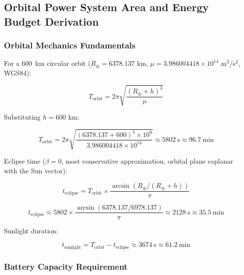 \subsection{Orbital Power System Area and Energy Budget Derivation}
\label{sec:orbit-power}

\subsubsection{Orbital Mechanics Fundamentals}

For a 600~km circular orbit ($R_{\oplus} = 6378.137$ km, $\mu = 3.986004418 \times 10^{14}$ m$^3$/s$^2$, WGS84):

\begin{equation}
  T_{\text{orbit}} = 2\pi\sqrt{\frac{(R_{\oplus} + h)^{3}}{\mu}}
  \label{eq:orbit-period}
\end{equation}

Substituting $h = 600$ km:

\begin{equation}
  T_{\text{orbit}} = 2\pi\sqrt{\frac{(6378.137 + 600)^{3} \times 10^{9}}{3.986004418 \times 10^{14}}}
                     \approx 5802\ \text{s} \approx 96.7\ \text{min}
\end{equation}

Eclipse time ($\beta = 0$, most conservative approximation, orbital plane coplanar with the Sun vector):

\begin{equation}
  t_{\text{eclipse}} = T_{\text{orbit}} \times \frac{\arcsin(R_{\oplus} / (R_{\oplus} + h))}{\pi}
  \label{eq:eclipse-time}
\end{equation}

\begin{equation}
  t_{\text{eclipse}} \approx 5802 \times \frac{\arcsin(6378.137 / 6978.137)}{\pi}
                     \approx 2128\ \text{s} \approx 35.5\ \text{min}
\end{equation}

Sunlight duration:

\begin{equation}
  t_{\text{sunlight}} = T_{\text{orbit}} - t_{\text{eclipse}} \approx 3674\ \text{s} \approx 61.2\ \text{min}
  \label{eq:sunlight-time}
\end{equation}

\subsubsection{Battery Capacity Requirement}

